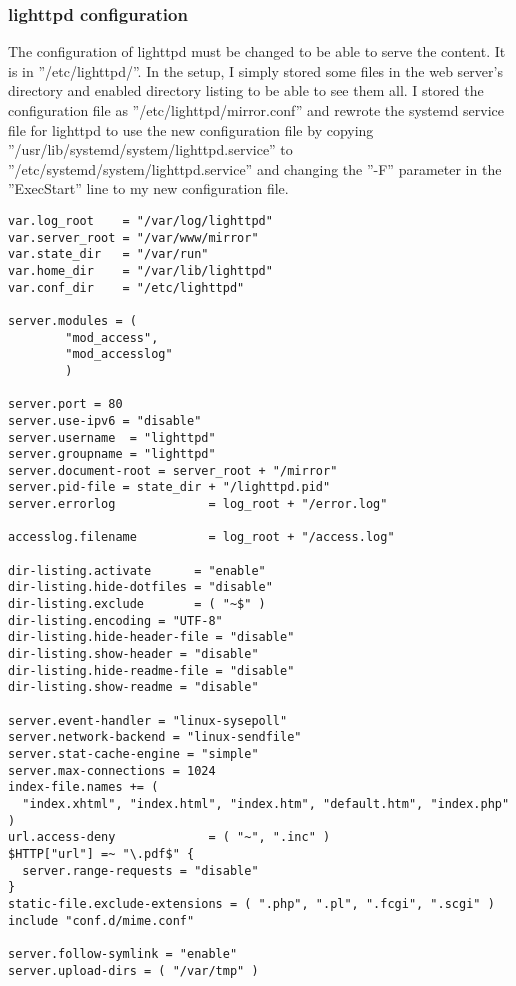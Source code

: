 \subsubsection{lighttpd configuration}
The configuration of lighttpd must be changed to be able to serve the content.
It is in ''/etc/lighttpd/''. In the setup, I simply stored some files in the web
server's directory and enabled directory listing to be able to see them all.
I stored the configuration file as ''/etc/lighttpd/mirror.conf'' and rewrote
the systemd service file for lighttpd to use the new configuration file by
copying ''/usr/lib/systemd/system/lighttpd.service'' to ''/etc/systemd/system/lighttpd.service''
and changing the ''-F'' parameter in the ''ExecStart'' line to my new configuration file.
\begin{lstlisting}
var.log_root    = "/var/log/lighttpd"
var.server_root = "/var/www/mirror"
var.state_dir   = "/var/run"
var.home_dir    = "/var/lib/lighttpd"
var.conf_dir    = "/etc/lighttpd"

server.modules = (
        "mod_access",
        "mod_accesslog"
        )

server.port = 80
server.use-ipv6 = "disable"
server.username  = "lighttpd"
server.groupname = "lighttpd"
server.document-root = server_root + "/mirror"
server.pid-file = state_dir + "/lighttpd.pid"
server.errorlog             = log_root + "/error.log"

accesslog.filename          = log_root + "/access.log"

dir-listing.activate      = "enable"
dir-listing.hide-dotfiles = "disable"
dir-listing.exclude       = ( "~$" )
dir-listing.encoding = "UTF-8"
dir-listing.hide-header-file = "disable"
dir-listing.show-header = "disable"
dir-listing.hide-readme-file = "disable"
dir-listing.show-readme = "disable"

server.event-handler = "linux-sysepoll"
server.network-backend = "linux-sendfile"
server.stat-cache-engine = "simple"
server.max-connections = 1024
index-file.names += (
  "index.xhtml", "index.html", "index.htm", "default.htm", "index.php"
)
url.access-deny             = ( "~", ".inc" )
$HTTP["url"] =~ "\.pdf$" {
  server.range-requests = "disable"
}
static-file.exclude-extensions = ( ".php", ".pl", ".fcgi", ".scgi" )
include "conf.d/mime.conf"

server.follow-symlink = "enable"
server.upload-dirs = ( "/var/tmp" )
\end{lstlisting}

